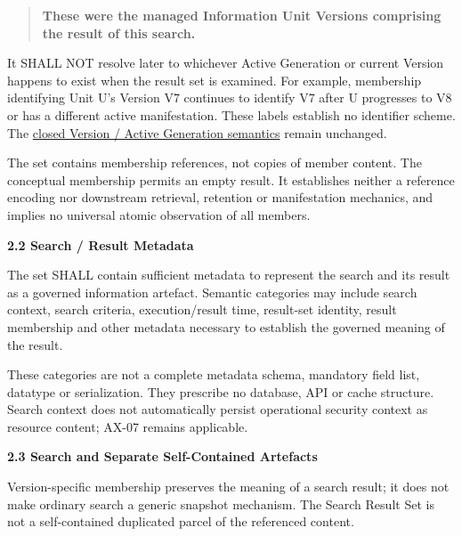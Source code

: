 \begin{quote}


\textbf{These were the managed Information Unit Versions comprising the result
of this search.}



\end{quote}


It SHALL NOT resolve later to whichever Active Generation or current Version
happens to exist when the result set is examined. For example, membership
identifying Unit U's Version V7 continues to identify V7 after U progresses to
V8 or has a different active manifestation. These labels establish no
identifier scheme. The \href{\detokenize{../../../../../docs/markdown/04-information-architecture/metamodel/information-architecture-metamodel.md#651-version-and-active-generation}}{closed Version / Active Generation semantics}
remain unchanged.



The set contains membership references, not copies of member content. The
conceptual \texttt{} membership permits an empty result. It establishes neither
a reference encoding nor downstream retrieval, retention or manifestation
mechanics, and implies no universal atomic observation of all members.



\par\medskip\textbf{2.2 Search / Result Metadata}\par


The set SHALL contain sufficient metadata to represent the search and its
result as a governed information artefact. Semantic categories may include
search context, search criteria, execution/result time, result-set identity,
result membership and other metadata necessary to establish the governed
meaning of the result.



These categories are not a complete metadata schema, mandatory field list,
datatype or serialization. They prescribe no database, API or cache structure.
Search context does not automatically persist operational security context as
resource content; AX-07 remains applicable.



\par\medskip\textbf{2.3 Search and Separate Self-Contained Artefacts}\par


Version-specific membership preserves the meaning of a search result; it does
not make ordinary search a generic snapshot mechanism. The Search Result Set
is not a self-contained duplicated parcel of the referenced content.



